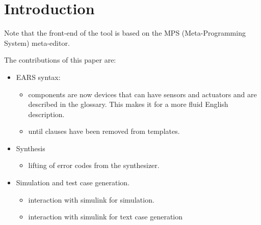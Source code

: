 \section{Introduction}

Note that the front-end of the tool is based on the MPS
(Meta-Programming System) meta-editor.

The contributions of this paper are:
\begin{itemize}
  \item EARS syntax:
\begin{itemize}
  \item components are now devices that can have sensors and actuators and are
  described in the glossary. This makes it for a more fluid English description. 
  \item until clauses have been removed from templates. 
\end{itemize}
\item{Synthesis}
\begin{itemize}
  \item lifting of error codes from the synthesizer. 
\end{itemize}
\item Simulation and test case generation.
\begin{itemize}
  \item interaction with simulink for simulation.
  \item interaction with simulink for text case generation
\end{itemize}

\end{itemize}